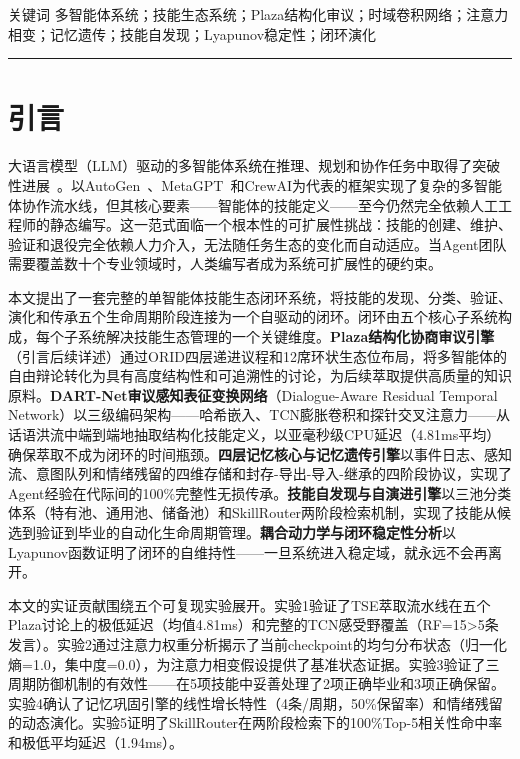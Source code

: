 \documentclass[12pt,a4paper]{ctexart}
\begin{document}
\vspace{6pt}
{\heiti{} 关键词\quad}{\kaishu{} 多智能体系统；技能生态系统；Plaza结构化审议；时域卷积网络；注意力相变；记忆遗传；技能自发现；Lyapunov稳定性；闭环演化}

\vspace{12pt}
\hrule
\vspace{12pt}

\section{引言}

大语言模型（LLM）驱动的多智能体系统在推理、规划和协作任务中取得了突破性进展~\cite{wu2023autogen,park2023generative,hong2023metagpt,shinn2023reflexion}。以AutoGen~\cite{wu2023autogen}、MetaGPT~\cite{hong2023metagpt}和CrewAI为代表的框架实现了复杂的多智能体协作流水线，但其核心要素——智能体的技能定义——至今仍然完全依赖人工工程师的静态编写。这一范式面临一个根本性的可扩展性挑战：技能的创建、维护、验证和退役完全依赖人力介入，无法随任务生态的变化而自动适应。当Agent团队需要覆盖数十个专业领域时，人类编写者成为系统可扩展性的硬约束。

本文提出了一套完整的单智能体技能生态闭环系统，将技能的发现、分类、验证、演化和传承五个生命周期阶段连接为一个自驱动的闭环。闭环由五个核心子系统构成，每个子系统解决技能生态管理的一个关键维度。\textbf{Plaza结构化协商审议引擎}（引言后续详述）通过ORID四层递进议程和12席环状生态位布局，将多智能体的自由辩论转化为具有高度结构性和可追溯性的讨论，为后续萃取提供高质量的知识原料。\textbf{DART-Net审议感知表征变换网络}（Dialogue-Aware Residual Temporal Network）以三级编码架构——哈希嵌入、TCN膨胀卷积和探针交叉注意力——从话语洪流中端到端地抽取结构化技能定义，以亚毫秒级CPU延迟（4.81ms平均）确保萃取不成为闭环的时间瓶颈。\textbf{四层记忆核心与记忆遗传引擎}以事件日志、感知流、意图队列和情绪残留的四维存储和封存-导出-导入-继承的四阶段协议，实现了Agent经验在代际间的100\%完整性无损传承。\textbf{技能自发现与自演进引擎}以三池分类体系（特有池、通用池、储备池）和SkillRouter两阶段检索机制，实现了技能从候选到验证到毕业的自动化生命周期管理。\textbf{耦合动力学与闭环稳定性分析}以Lyapunov函数证明了闭环的自维持性——一旦系统进入稳定域，就永远不会再离开。

本文的实证贡献围绕五个可复现实验展开。实验1验证了TSE萃取流水线在五个Plaza讨论上的极低延迟（均值4.81ms）和完整的TCN感受野覆盖（RF=15>5条发言）。实验2通过注意力权重分析揭示了当前checkpoint的均匀分布状态（归一化熵=1.0，集中度=0.0），为注意力相变假设提供了基准状态证据。实验3验证了三周期防御机制的有效性——在5项技能中妥善处理了2项正确毕业和3项正确保留。实验4确认了记忆巩固引擎的线性增长特性（4条/周期，50\%保留率）和情绪残留的动态演化。实验5证明了SkillRouter在两阶段检索下的100\%Top-5相关性命中率和极低平均延迟（1.94ms）。
\end{document}
